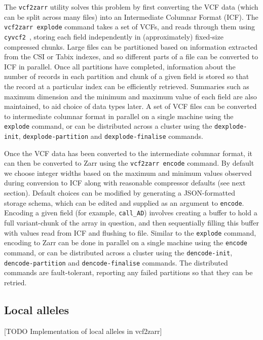 \documentclass[a4paper,num-refs]{oup-contemporary}
\begin{document}
The \texttt{vcf2zarr} utility solves this problem by first converting
the VCF data (which can be split across many files) into an Intermediate
Columnar Format (ICF). The \texttt{vcf2zarr explode} command takes a set
of VCFs, and reads through them using
\texttt{cyvcf2}~\cite{pedersen2017cyvcf2},
storing each field independently in (approximately) fixed-size
compressed chunks.
Large files can be partitioned based on information extracted from the
CSI or Tabix indexes, and so different parts of a file can be
converted to ICF in parallel.
Once all partitions have completed, information about
the number of records in each partition and chunk of a given
field is stored so that the record at a particular index
can be efficiently retrieved.
Summaries such as maximum dimension and the minimum and maximum value
of each field are also maintained, to aid choice of data types later.
A set of VCF files can be converted to intermediate columnar
format in parallel on a single machine
using the \texttt{explode} command,
or can be distributed across a cluster using the
\texttt{dexplode-init},
\texttt{dexplode-partition} and \texttt{dexplode-finalise} commands.

Once the VCF data has been converted to the intermediate columnar format,
it can then be converted to Zarr using the \texttt{vcf2zarr encode}
command. By default we choose integer widths based on the maximum
and minimum values observed during conversion to ICF
along with reasonable compressor defaults (see next section).
Default choices can be
modified by generating a JSON-formatted storage schema,
which can be edited and supplied as an argument to \texttt{encode}.
Encoding a given field (for example, \texttt{call\_AD})
involves creating a buffer to hold a full variant-chunk of the
array in question, and then sequentially filling this buffer with
values read from ICF and flushing to file.
 Similar to the \texttt{explode} command,
encoding to Zarr can be done in parallel on a single
machine using the \texttt{encode} command,
or can be distributed across a cluster using the
\texttt{dencode-init},
\texttt{dencode-partition} and \texttt{dencode-finalise} commands.
The distributed commands are fault-tolerant, reporting any failed
partitions so that they can be retried.

\subsection{Local alleles}
[TODO Implementation of local alleles in vcf2zarr]
\end{document}
